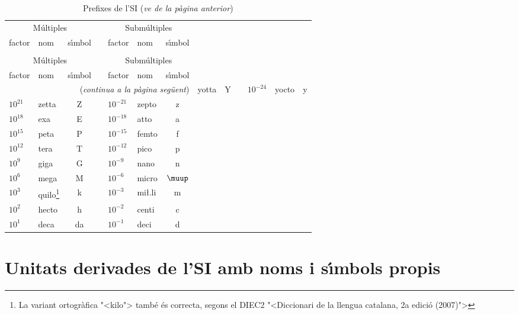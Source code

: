 \begin{longtable}[h]{llccllc}
   \caption{\label{taula:SI-prefixes} Prefixes de  l'SI}\\
   \toprule[1pt]
   \multicolumn{3}{c}{M\'{u}ltiples} & & \multicolumn{3}{c}{Subm\'{u}ltiples}\\
   \cmidrule(rl){1-3} \cmidrule(rl){5-7}
   factor & nom & s\'{\i}mbol & & factor & nom & s\'{\i}mbol\\
   \midrule
   \endfirsthead
   \caption[]{Prefixes de  l'SI (\emph{ve de la p\`{a}gina  anterior})}\\
   \toprule[1pt]
    \multicolumn{3}{c}{M\'{u}ltiples} & & \multicolumn{3}{c}{Subm\'{u}ltiples}\\
   \cmidrule(rl){1-3} \cmidrule(rl){5-7}
   factor & nom & s\'{\i}mbol & & factor & nom & s\'{\i}mbol\\
   \midrule
   \endhead
   \midrule
   \multicolumn{7}{r}{(\emph{continua a la p\`{a}gina seg\"{u}ent})}
   \endfoot
   \endlastfoot
    $10^{24}$ &  yotta & Y & & $10^{-24}$ & yocto & y \\
    $10^{21}$ &  zetta & Z & & $10^{-21}$ & zepto & z \\
    $10^{18}$ &  exa & E & & $10^{-18}$ & atto & a \\
    $10^{15}$ &  peta & P & & $10^{-15}$ & femto & f \\
    $10^{12}$ &  tera & T & & $10^{-12}$ & pico & p \\
    $10^{9}$ &  giga & G & & $10^{-9}$ & nano & n \\
    $10^{6}$ &  mega & M & & $10^{-6}$ & micro & $\micro$ \\
    $10^{3}$ &  quilo\footnote{La variant ortogr\`{a}fica {"<}kilo{">} tamb\'{e} \'{e}s correcta, segons el DIEC2 {"<}Diccionari de la llengua catalana, 2a edici\'{o} (2007){">}} & k & & $10^{-3}$ & mi{\l.l}i & m \\
    $10^{2}$ &  hecto & h & & $10^{-2}$ & centi & c \\
    $10^{1}$ &  deca & da & & $10^{-1}$ & deci & d \\
   \bottomrule[1pt]
\end{longtable}
      
       
     



\section{Unitats derivades de l'SI amb noms i s\'{\i}mbols propis}

